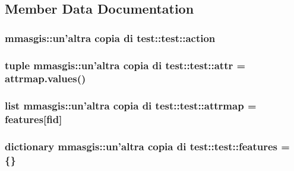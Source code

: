 \subsection{Member Data Documentation}
\hypertarget{classmmasgis_1_1un'altra_01copia_01di_01test_1_1test_a1eb8eb10d60f83934f88cf8886c34383}{
\subsubsection[{action}]{\setlength{\rightskip}{0pt plus 5cm}mmasgis::un'altra copia di test::test::action}}
\label{classmmasgis_1_1un'altra_01copia_01di_01test_1_1test_a1eb8eb10d60f83934f88cf8886c34383}
\hypertarget{classmmasgis_1_1un'altra_01copia_01di_01test_1_1test_a06f84d33538c4452934bb3d205dc801c}{
\subsubsection[{attr}]{\setlength{\rightskip}{0pt plus 5cm}tuple mmasgis::un'altra copia di test::test::attr = attrmap.values()}}
\label{classmmasgis_1_1un'altra_01copia_01di_01test_1_1test_a06f84d33538c4452934bb3d205dc801c}
\hypertarget{classmmasgis_1_1un'altra_01copia_01di_01test_1_1test_a170fe064b241dea5edbdae213ce0a8db}{
\subsubsection[{attrmap}]{\setlength{\rightskip}{0pt plus 5cm}list mmasgis::un'altra copia di test::test::attrmap = {\bf features}\mbox{[}fid\mbox{]}}}
\label{classmmasgis_1_1un'altra_01copia_01di_01test_1_1test_a170fe064b241dea5edbdae213ce0a8db}
\hypertarget{classmmasgis_1_1un'altra_01copia_01di_01test_1_1test_aff53db0dcc1c3580be177fa054eac6ec}{
\subsubsection[{features}]{\setlength{\rightskip}{0pt plus 5cm}dictionary mmasgis::un'altra copia di test::test::features = \{\}}}
